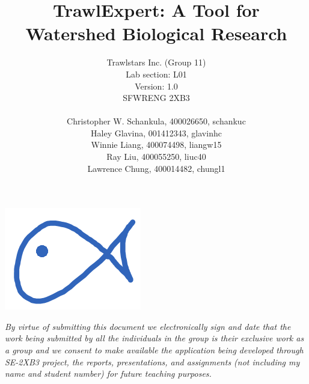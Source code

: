\documentclass{article}
\begin{document}
\title{\textbf{TrawlExpert: A Tool for Watershed Biological Research}}
\author{Trawlstars Inc. (Group 11) \\ Lab section: L01  \\ Version: 1.0 \\ SFWRENG 2XB3 \\ \\ Christopher W. Schankula, 400026650, schankuc \\ Haley Glavina, 001412343, glavinhc \\ Winnie Liang, 400074498, liangw15 \\ Ray Liu, 400055250, liuc40 \\ Lawrence Chung, 400014482, chungl1\\}


\maketitle

\begin{center}
\includegraphics{logo.png}
\end{center}

\newpage

\begin{versionhistory}
\end{versionhistory} 

\noindent\textit{By virtue of submitting this document we electronically sign and date that the work being submitted by all the individuals in the group is their exclusive work as a group and we consent to make available the application being developed through SE-2XB3 project, the reports, presentations, and assignments (not including my name and student number) for future teaching purposes.}

\newpage
\end{document}
